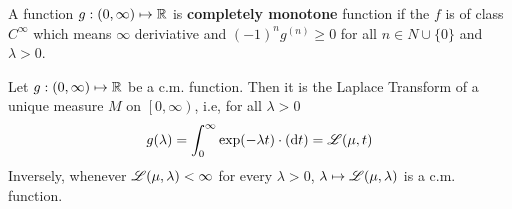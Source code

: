 	\begin{definition}
		A function $g: (0,\infty)\mapsto \mathbb{R}$ is \textbf{completely monotone} function if the $f$ is of class $C^\infty$ which means $\infty$ deriviative and $(-1)^ng^{(n)}\geq 0$ for all $n\in N\cup \{0\}$ and $\lambda>0$.
	\end{definition}

	\begin{theorem}
		Let $g:(0,\infty)\mapsto \mathbb{R}$ be a c.m. function. Then it is the Laplace Transform of a unique measure $M$ on $\left[0, \infty\right)$, i.e, for all $\lambda>0$
		$$g(\lambda) = \int^{\infty}_0\exp(-\lambda t)\cdot (\mathrm{d} t) = \mathscr{L}(\mu, t)$$
		Inversely, whenever $\mathscr{L}(\mu, \lambda)<\infty $ for every $\lambda>0$, $\lambda \mapsto \mathscr{L}(\mu,\lambda)$ is a c.m. function.
	\end{theorem}
